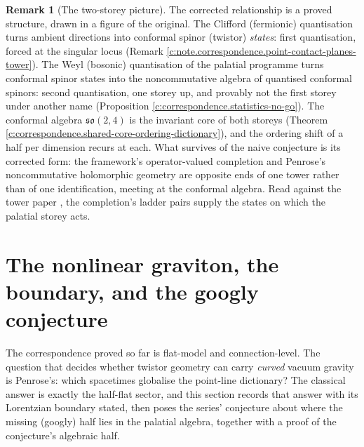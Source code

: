 \documentclass[11pt]{article}
\theoremstyle{definition}
\newtheorem{remark}[theorem]{Remark}
\theoremstyle{plain}
\newcommand{\changedmark}[2]{\marginpar{\raggedright\scriptsize\color{#1}#2}}
\begin{document}
\begin{remark}[The two-storey picture]\label{c:note.correspondence.two-storey-picture}
\changedmark{gray}{reworded}
The corrected relationship is a proved structure, drawn in a figure of the original. The Clifford (fermionic) quantisation turns ambient directions into conformal spinor (twistor) \emph{states}: first quantisation, forced at the singular locus (Remark \ref{c:note.correspondence.point-contact-planes-tower}). The Weyl (bosonic) quantisation of the palatial programme turns conformal spinor states into the noncommutative algebra of quantised conformal spinors: second quantisation, one storey up, and provably not the first storey under another name (Proposition \ref{c:correspondence.statistics-no-go}). The conformal algebra $\mathfrak{so}(2,4)$ is the invariant core of both storeys (Theorem \ref{c:correspondence.shared-core-ordering-dictionary}), and the ordering shift of a half per dimension recurs at each. What survives of the naive conjecture is its corrected form: the framework's operator-valued completion and Penrose's noncommutative holomorphic geometry are opposite ends of one tower rather than of one identification, meeting at the conformal algebra. Read against the tower paper \cite{ButlerT3}, the completion's ladder pairs supply the states on which the palatial storey acts.
\end{remark}

\section{The nonlinear graviton, the boundary, and the googly conjecture}

\label{c:note.correspondence.setting-nonlinear-graviton-boundary-googly-conjecture}
The correspondence proved so far is flat-model and connection-level. The question that decides whether twistor geometry can carry \emph{curved} vacuum gravity is Penrose's: which spacetimes globalise the point-line dictionary? The classical answer is exactly the half-flat sector, and this section records that answer with its Lorentzian boundary stated, then poses the series' conjecture about where the missing (googly) half lies in the palatial algebra, together with a proof of the conjecture's algebraic half.
\end{document}
